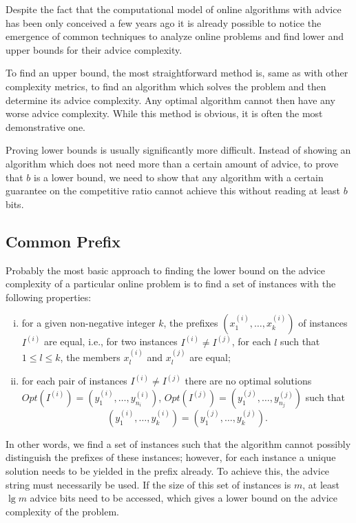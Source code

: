 Despite the fact that the computational model of online algorithms with
advice has been only conceived a few years ago it is already possible to
notice the emergence of common techniques to analyze online problems and
find lower and upper bounds for their advice complexity.

To find an upper bound, the most straightforward method is, same as with
other complexity metrics, to find an algorithm which solves the problem
and then determine its advice complexity. Any optimal algorithm cannot
then have any worse advice complexity. While this method is obvious, it is
often the most demonstrative one.

Proving lower bounds is usually significantly more difficult. Instead of
showing an algorithm which does not need more than a certain amount of
advice, to prove that $b$ is a lower bound, we need to show that any
algorithm with a certain guarantee on the competitive ratio cannot achieve
this without reading at least $b$ bits.

\subsection{Common Prefix}
\label{section:common-prefix}

Probably the most basic approach to finding the lower bound on the advice
complexity of a particular online problem is to find a set of instances
with the following properties:

\begin{enumerate}[(i)]
    \item
    for a given non-negative integer $k$, the prefixes $(x_1^{(i)}, \dots,
    x_k^{(i)})$ of instances $I^{(i)}$ are equal, i.e., for two instances
    $I^{(i)} \not= I^{(j)}$, for each $l$ such that $1 \leq l \leq k$,
    the members $x_l^{(i)}$ and $x_l^{(j)}$ are equal;

    \item
    for each pair of instances $I^{(i)} \not= I^{(j)}$ there are no
    optimal solutions $Opt(I^{(i)}) = (y_1^{(i)}, \dots, y_{n_i}^{(i)})$,
    $Opt(I^{(j)}) = (y_1^{(j)}, \dots, y_{n_j}^{(j)})$ such that
    $$
        (y_1^{(i)}, \dots, y_{k}^{(i)}) = (y_1^{(j)}, \dots, y_{k}^{(j)}).
    $$
\end{enumerate}

In other words, we find a set of instances such that the algorithm cannot
possibly distinguish the prefixes of these instances; however, for each
instance a unique solution needs to be yielded in the prefix already. To
achieve this, the advice string must necessarily be used. If the size of
this set of instances is $m$, at least $\lg m$ advice bits need to be
accessed, which gives a lower bound on the advice complexity of the
problem.


